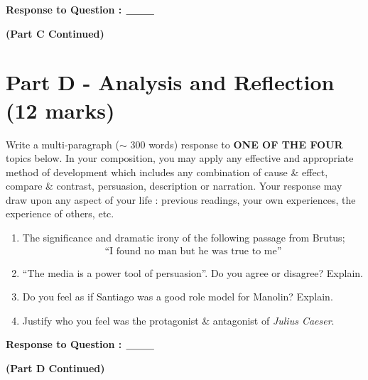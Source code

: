 \documentclass[12pt]{article} %
\begin{document}
\begin{qstn}
            \vspace*{1cm}

  \textbf{Response to Question : $\underline{ \hspace*{1cm}}$}

  \newpage
  \textbf{(Part C Continued)}
    \vspace*{19cm}

    \newpage

\section*{Part D - Analysis and Reflection (12 marks)}
Write a multi-paragraph ($\sim$ 300 words) response to \textbf{ONE OF THE FOUR} topics below. In your composition, you may apply
any effective and appropriate method of development which includes any combination of cause \& effect, compare \& contrast,
persuasion, description or narration. Your response may draw upon any aspect of your life : previous readings, your own
experiences, the experience of others, etc.

\begin{enumerate}
  \item The significance and dramatic irony of the following passage from Brutus;
        \begin{align*}
           \text{``I found no man but he was true to me''} \tag{V : V 35-40}
        \end{align*}
  \item ``The media is a power tool of persuasion''. Do you agree or disagree? Explain.
  \item Do you feel as if Santiago was a good role model for Manolin? Explain.
  \item Justify who you feel was the protagonist \& antagonist of \textit{Julius Caeser}.
\end{enumerate}

\vspace*{1cm}

\textbf{Response to Question : $\underline{ \hspace*{1cm}}$}

\newpage
\textbf{(Part D Continued)}
\vspace*{19cm}

\newpage





\end{qstn}
\end{document}
